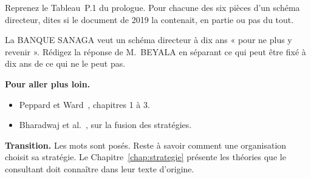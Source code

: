 \begin{boxexo}[title={\ding{45}\quad Exercice~1.3. Six pièces \niveaumoyen}]
Reprenez le Tableau~P.1 du prologue. Pour chacune des six pièces d'un schéma directeur, dites si le document de 2019 la contenait, en partie ou pas du tout.
\end{boxexo}

\begin{boxexo}[title={\ding{45}\quad Exercice~1.4. Horizon \niveauexpert}]
La BANQUE SANAGA veut un schéma directeur à dix ans « pour ne plus y revenir ». Rédigez la réponse de M.~BEYALA en séparant ce qui peut être fixé à dix ans de ce qui ne le peut pas.
\end{boxexo}

\bigskip

\begin{boxinfo}
\textbf{Pour aller plus loin.}
\begin{itemize}
    \item Peppard et Ward~\cite{wardpeppard2016}, chapitres 1 à 3.
    \item Bharadwaj et al.~\cite{bharadwaj2013}, sur la fusion des stratégies.
\end{itemize}
\end{boxinfo}

\begin{boxinfo}
\textbf{Transition.} Les mots sont posés. Reste à savoir comment une organisation choisit sa stratégie. Le Chapitre~\ref{chap:strategie} présente les théories que le consultant doit connaître dans leur texte d'origine.
\end{boxinfo}
